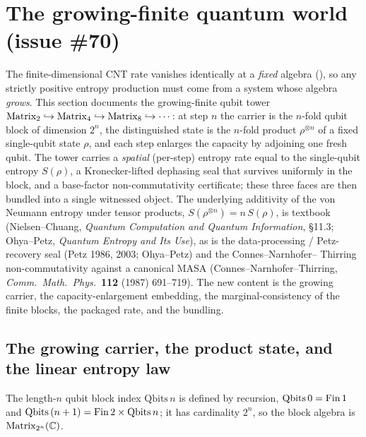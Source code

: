\section{The growing-finite quantum world (issue \#70)}
\label{sec:growing-tower}

The finite-dimensional CNT rate vanishes identically at a \emph{fixed} algebra
(), so any strictly positive entropy production must come from a
system whose algebra \emph{grows}. This section documents the growing-finite qubit tower
\(\operatorname{Matrix}_2 \hookrightarrow \operatorname{Matrix}_4 \hookrightarrow \operatorname{Matrix}_8 \hookrightarrow \cdots\): at step
\(n\) the carrier is the \(n\)-fold qubit block of dimension \(2^{n}\), the distinguished state is the
\(n\)-fold product \(\rho^{\otimes n}\) of a fixed single-qubit state \(\rho\), and each step enlarges
the capacity by adjoining one fresh qubit. The tower carries a \emph{spatial} (per-step) entropy rate
equal to the single-qubit entropy \(S(\rho)\), a Kronecker-lifted dephasing seal that survives
uniformly in the block, and a base-factor non-commutativity certificate; these three faces are then
bundled into a single witnessed object. The underlying additivity of the von Neumann entropy under
tensor products, \(S(\rho^{\otimes n}) = n\,S(\rho)\), is textbook (Nielsen--Chuang, \emph{Quantum
Computation and Quantum Information}, \S11.3; Ohya--Petz, \emph{Quantum Entropy and Its Use}), as is
the data-processing / Petz-recovery seal (Petz 1986, 2003; Ohya--Petz) and the Connes--Narnhofer--
Thirring non-commutativity against a canonical MASA (Connes--Narnhofer--Thirring, \emph{Comm.\ Math.\
Phys.}\ \textbf{112} (1987) 691--719). The new content is the growing carrier, the
capacity-enlargement embedding, the marginal-consistency of the finite blocks, the packaged rate, and
the bundling.

\subsection{The growing carrier, the product state, and the linear entropy law}

\begin{definition}[Growing qubit carrier]\label{Qbits}
  \leanok
  The length-\(n\) qubit block index \(\mathrm{Qbits}\,n\) is defined by recursion,
  \(\mathrm{Qbits}\,0 = \operatorname{Fin} 1\) and \(\mathrm{Qbits}\,(n+1) = \operatorname{Fin} 2\times\mathrm{Qbits}\,n\); it has
  cardinality \(2^{n}\), so the block algebra is \(\operatorname{Matrix}_{2^{n}}(\mathbb{C})\).
\end{definition}


